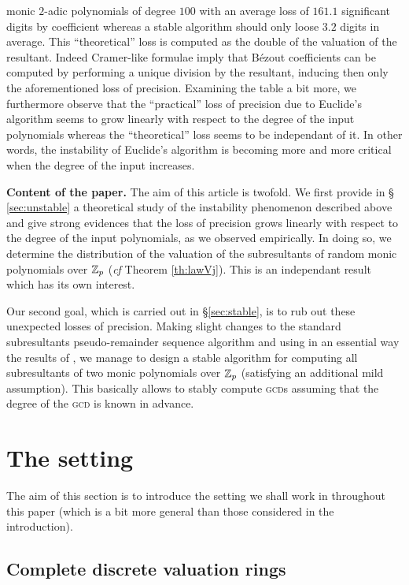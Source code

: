 \documentclass{sig-alternate}
\begin{document}
monic $2$-adic polynomials of degree $100$ with an average loss of 
$161.1$ significant digits by coefficient whereas a stable 
algorithm should only loose $3.2$ digits in average. This 
``theoretical'' loss is computed as the double of the valuation of the 
resultant. Indeed Cramer-like formulae imply that B\'ezout coefficients 
can be computed by performing a unique division by the resultant, 
inducing then only the aforementioned loss of precision. Examining the 
table a bit more, we furthermore observe that the ``practical'' loss of 
precision due to Euclide's algorithm seems to grow linearly with respect 
to the degree of the input polynomials whereas the ``theoretical'' loss 
seems to be independant of it. In other words, the instability of 
Euclide's algorithm is becoming more and more critical when the degree 
of the input increases.

\medskip

\noindent
{\bf Content of the paper.}
The aim of this article is twofold. We first provide in \S 
\ref{sec:unstable} a theoretical study of the instability phenomenon 
described above and give strong evidences that the loss of precision 
grows linearly with respect to the degree of the input polynomials, as we 
observed empirically. In doing so, we determine the distribution of the 
valuation of the subresultants of random monic polynomials over $\mathbb Z_p$ 
(\emph{cf} Theorem \ref{th:lawVj}). This is an independant result which 
has its own interest.

Our second goal, which is carried out in \S \ref{sec:stable}, is to rub 
out these unexpected losses of precision. Making slight changes to the 
standard subresultants pseudo-remainder sequence algorithm and using in 
an essential way the results of \cite{padicprec}, we manage to design a stable 
algorithm for computing all subresultants of two monic polynomials over 
$\mathbb Z_p$ (satisfying an additional mild assumption). This basically allows 
to stably compute \textsc{gcd}s assuming that the degree of the 
\textsc{gcd} is known in advance.

\section{The setting}

The aim of this section is to introduce the setting we shall work in 
throughout this paper (which is a bit more general than those considered 
in the introduction).

\subsection{Complete discrete valuation rings}
\end{document}
